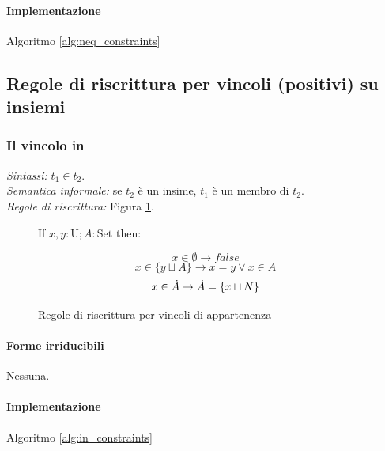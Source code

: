 \documentclass[12pt,a4paper,openright]{book} %
\begin{document}
\paragraph{Implementazione}
Algoritmo \ref{alg:neq_constraints}

\subsection{Regole di riscrittura per vincoli (positivi) su insiemi}
\label{subsec:clpbasedlang_lset_rewriteset}

\subsubsection{Il vincolo in}

\textit{Sintassi:} $t_1 \in t_2$.\\
\noindent\textit{Semantica informale:} se $t_2$ è un insime, $t_1$ è un membro di $t_2$.\\
\noindent\textit{Regole di riscrittura:} Figura \ref{fig:in_constraints}.

\begin{figure}
	\begin{tcolorbox}[colframe=black, colback=white, sharp corners]
		\setcounter{equation}{0}
		\renewcommand{\theequation}{$\in$\textsubscript{\arabic{equation}}}

		If $x, y: \text{U}; A: \text{Set}$ then:

		\begin{equation}
		x \in \emptyset \to false
		\end{equation}
		\begin{equation}
		x \in \{ y \sqcup A \} \to x = y \lor x \in A
		\end{equation}
		\begin{equation}
		x \in \dot{A} \to \dot{A} = \{ x \sqcup N \}
		\end{equation}

	\end{tcolorbox}

	\caption{Regole di riscrittura per vincoli di appartenenza}
	\label{fig:in_constraints}
\end{figure}

\paragraph{Forme irriducibili} Nessuna.

\paragraph{Implementazione}
Algoritmo \ref{alg:in_constraints}
\end{document}
